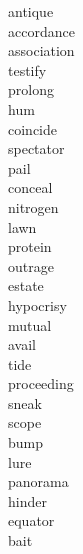 \documentclass[a4paper, 11pt]{ctexart}
\begin{document}
\begin{multicols*}{3}
\begin{description}
\item[antique]

\item[accordance]

\item[association]

\item[testify]

\item[prolong]

\item[hum]

\item[coincide]

\item[spectator]

\item[pail]

\item[conceal]

\item[nitrogen]

\item[lawn]

\item[protein]

\item[outrage]

\item[estate]

\item[hypocrisy]

\item[mutual]

\item[avail]

\item[tide]

\item[proceeding]

\item[sneak]

\item[scope]

\item[bump]

\item[lure]

\item[panorama]

\item[hinder]

\item[equator]

\item[bait]


\end{description}
\end{multicols*}
\end{document}

